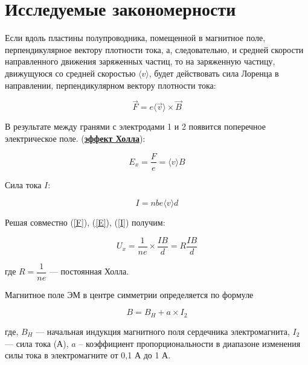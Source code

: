 \section*{Исследуемые закономерности}

Если вдоль пластины полупроводника, помещенной в магнитное поле,
перпендикулярное вектору плотности тока, а, следовательно, и средней скорости направленного движения
заряженных частиц, то на заряженную частицу, движущуюся со средней скоростью $ \langle v \rangle $, будет действовать
сила Лоренца в направлении, перпендикулярном вектору плотности тока:

\begin{equation}\label{F}
    \overrightarrow{F} = 
    e\langle \overrightarrow{v} \rangle \times \overrightarrow{B}
\end{equation}

В результате между гранями с электродами 1 и 2
появится поперечное электрическое поле. (\textbf{\underline{эффект Холла}}):

\begin{equation}\label{E}
    E_x = \dfrac{F}{e} = \langle v \rangle B
\end{equation}

Сила тока $ I $:

\begin{equation}\label{I}
    I = nbe\langle v \rangle d
\end{equation}

Решая совместно (\ref{F}), (\ref{E}), (\ref{I}) получим:

\begin{equation}\label{U}
    U_x = \dfrac{1}{ne}\times\dfrac{IB}{d} = R\dfrac{IB}{d} 
\end{equation}

где $ R = \dfrac{1}{ne}$ --- постоянная Холла.

Магнитное поле ЭМ в центре симметрии определяется по формуле 

\begin{equation}\label{B}
    B = B_H + a \times I_2
\end{equation}

где, 
$ B_H $ --- начальная индукция магнитного поля сердечника электромагнита, 
$ I_2 $ --- сила тока (А), 
$ a $ – коэффициент пропорциональности 
в диапазоне изменения силы тока в электромагните от 0,1 А до 1 А.

